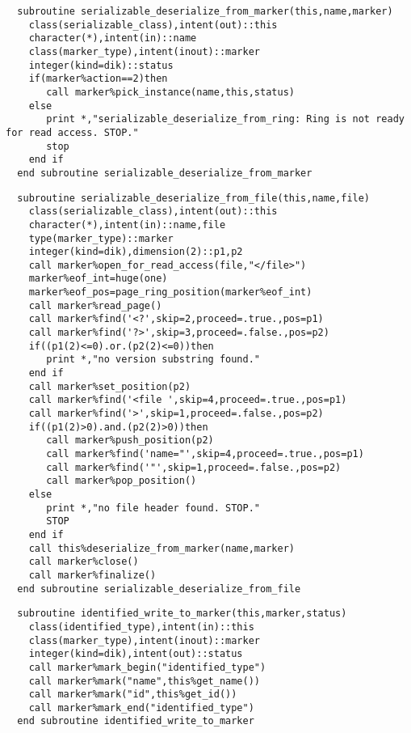 \begin{Verbatim}
  subroutine serializable_deserialize_from_marker(this,name,marker)
    class(serializable_class),intent(out)::this
    character(*),intent(in)::name
    class(marker_type),intent(inout)::marker
    integer(kind=dik)::status
    if(marker%action==2)then
       call marker%pick_instance(name,this,status)
    else       
       print *,"serializable_deserialize_from_ring: Ring is not ready for read access. STOP."
       stop
    end if
  end subroutine serializable_deserialize_from_marker
\end{Verbatim}

\begin{Verbatim}
  subroutine serializable_deserialize_from_file(this,name,file)
    class(serializable_class),intent(out)::this
    character(*),intent(in)::name,file
    type(marker_type)::marker
    integer(kind=dik),dimension(2)::p1,p2
    call marker%open_for_read_access(file,"</file>")
    marker%eof_int=huge(one)
    marker%eof_pos=page_ring_position(marker%eof_int)
    call marker%read_page()
    call marker%find('<?',skip=2,proceed=.true.,pos=p1)
    call marker%find('?>',skip=3,proceed=.false.,pos=p2)
    if((p1(2)<=0).or.(p2(2)<=0))then
       print *,"no version substring found."
    end if
    call marker%set_position(p2)
    call marker%find('<file ',skip=4,proceed=.true.,pos=p1)
    call marker%find('>',skip=1,proceed=.false.,pos=p2)
    if((p1(2)>0).and.(p2(2)>0))then
       call marker%push_position(p2)
       call marker%find('name="',skip=4,proceed=.true.,pos=p1)
       call marker%find('"',skip=1,proceed=.false.,pos=p2)
       call marker%pop_position()
    else
       print *,"no file header found. STOP."
       STOP
    end if
    call this%deserialize_from_marker(name,marker)
    call marker%close()
    call marker%finalize()
  end subroutine serializable_deserialize_from_file
\end{Verbatim}
\begin{Verbatim}
  subroutine identified_write_to_marker(this,marker,status)
    class(identified_type),intent(in)::this
    class(marker_type),intent(inout)::marker
    integer(kind=dik),intent(out)::status
    call marker%mark_begin("identified_type")
    call marker%mark("name",this%get_name())
    call marker%mark("id",this%get_id())
    call marker%mark_end("identified_type")
  end subroutine identified_write_to_marker
\end{Verbatim}


